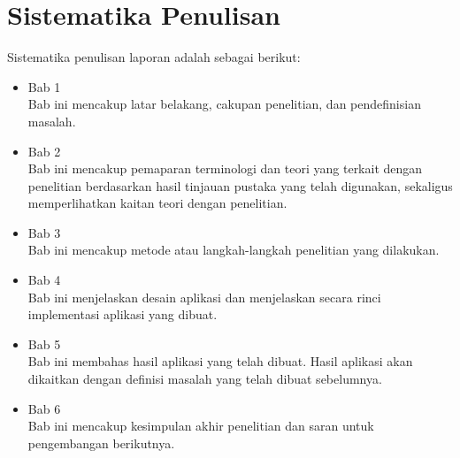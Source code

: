 \section{Sistematika Penulisan}
\label{sec:sistematikaPenulisan}
Sistematika penulisan laporan adalah sebagai berikut:
\begin{itemize}
	\item Bab 1 \babSatu \\
	    Bab ini mencakup latar belakang, cakupan penelitian, dan pendefinisian masalah.
	\item Bab 2 \babDua \\
	    Bab ini mencakup pemaparan terminologi dan teori yang terkait dengan penelitian berdasarkan hasil tinjauan pustaka yang telah digunakan, sekaligus memperlihatkan kaitan teori dengan penelitian.
	\item Bab 3 \babTiga \\
	    Bab ini mencakup metode atau langkah-langkah penelitian yang dilakukan. 
	\item Bab 4 \babEmpat \\
		Bab ini menjelaskan desain aplikasi dan menjelaskan secara rinci implementasi aplikasi yang dibuat.
	\item Bab 5 \babLima \\
	    Bab ini membahas hasil aplikasi yang telah dibuat. Hasil aplikasi akan dikaitkan dengan definisi masalah yang telah dibuat sebelumnya.
	\item Bab 6 \kesimpulan \\
	    Bab ini mencakup kesimpulan akhir penelitian dan saran untuk pengembangan berikutnya.
\end{itemize}


